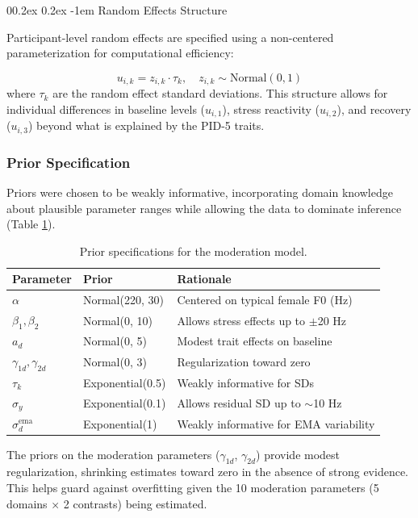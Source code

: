 \documentclass[
  english,
  man,floatsintext]{apa6}
\makeatletter
\let\oldparagraph\paragraph
\renewcommand{\paragraph}{
    \@ifstar
      \xxxParagraphStar
      \xxxParagraphNoStar
  }
\newcommand{\xxxParagraphStar}[1]{\oldparagraph*{#1}\mbox{}}
\newcommand{\xxxParagraphNoStar}[1]{\oldparagraph{#1}\mbox{}}
\renewcommand{\paragraph}{\@startsection{paragraph}{4}{\parindent}%
  {0\baselineskip \@plus 0.2ex \@minus 0.2ex}%
  {-1em}%
  {\normalfont\normalsize\bfseries\itshape\typesectitle}}
\makeatother
\begin{document}
\paragraph{Random Effects Structure}\label{random-effects-structure}

Participant-level random effects are specified using a non-centered parameterization for computational efficiency:

\[
u_{i,k} = z_{i,k} \cdot \tau_k, \quad z_{i,k} \sim \text{Normal}(0, 1)
\]
where \(\tau_k\) are the random effect standard deviations. This structure allows for individual differences in baseline levels (\(u_{i,1}\)), stress reactivity (\(u_{i,2}\)), and recovery (\(u_{i,3}\)) beyond what is explained by the PID-5 traits.

\subsubsection{Prior Specification}\label{prior-specification-1}

Priors were chosen to be weakly informative, incorporating domain knowledge about plausible parameter ranges while allowing the data to dominate inference (Table \ref{tab:table-s9-priors-moderation}).

\begin{table}

\caption{\label{tab:table-s9-priors-moderation}Prior specifications for the moderation model.}
\centering
\begin{tabular}[t]{lll}
\toprule
Parameter & Prior & Rationale\\
\midrule
$\alpha$ & Normal(220, 30) & Centered on typical female F0 (Hz)\\
$\beta_1, \beta_2$ & Normal(0, 10) & Allows stress effects up to $\pm$20 Hz\\
$a_d$ & Normal(0, 5) & Modest trait effects on baseline\\
$\gamma_{1d}, \gamma_{2d}$ & Normal(0, 3) & Regularization toward zero\\
$\tau_k$ & Exponential(0.5) & Weakly informative for SDs\\
\addlinespace
$\sigma_y$ & Exponential(0.1) & Allows residual SD up to $\sim$10 Hz\\
$\sigma_d^{\text{ema}}$ & Exponential(1) & Weakly informative for EMA variability\\
\bottomrule
\end{tabular}
\end{table}

The priors on the moderation parameters (\(\gamma_{1d}\), \(\gamma_{2d}\)) provide modest regularization, shrinking estimates toward zero in the absence of strong evidence. This helps guard against overfitting given the 10 moderation parameters (5 domains × 2 contrasts) being estimated.
\end{document}
